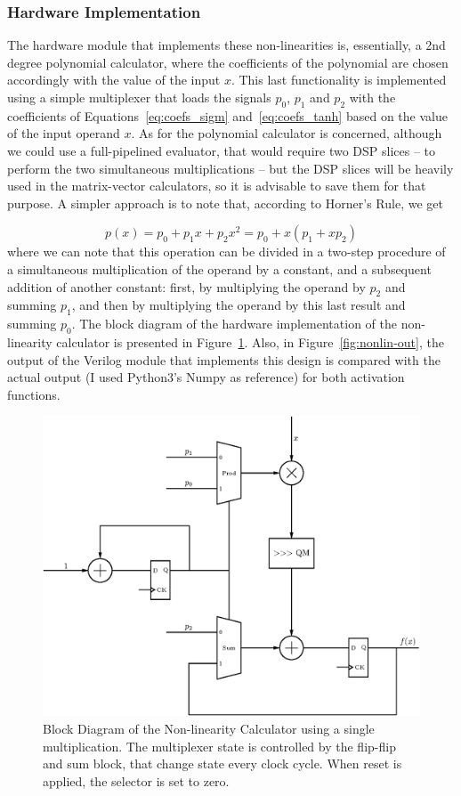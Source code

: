 \subsubsection{Hardware Implementation}
The hardware module that implements these non-linearities is, essentially, a 2nd degree polynomial calculator, where the coefficients of the polynomial are chosen accordingly with the value of the input $x$. This last functionality
is implemented using a simple multiplexer that loads the signals $p_0$, $p_1$ and $p_2$ with the coefficients of Equations~\ref{eq:coefs_sigm} and~\ref{eq:coefs_tanh} based on the value of the input operand $x$. As for the polynomial calculator is concerned, although we could use a full-pipelined evaluator, that would require two DSP slices -- to perform the two simultaneous multiplications -- but the DSP slices will be heavily used in the matrix-vector calculators, so it is advisable to save them for that purpose. A simpler approach is to note that, according to Horner's Rule, we get 

\begin{equation}\label{eq:factorPol}
p(x) = p_0 + p_1x + p_2x^2 = p_0 + x(p_1 + xp_2)
\end{equation}
where we can note that this operation can be divided in a two-step procedure of a simultaneous multiplication of the operand by a constant, and a subsequent addition of another constant: first, by multiplying the operand by $p_2$ and summing $p_1$, and then by multiplying the operand by this last result and summing $p_0$. The block diagram of the hardware implementation of the non-linearity calculator is presented in Figure~\ref{fig:nonlin}. Also, in Figure~\ref{fig:nonlin-out}, the output of the Verilog module that implements this design is compared with the actual output (I used Python3's Numpy as reference) for both activation functions.

\begin{figure}
    \centering
    \includegraphics[width=0.9\linewidth]{figures/non-lin.eps}
    \caption[Block Diagram of the Non-linearity Calculator]{Block Diagram of the Non-linearity Calculator using a single multiplication. The multiplexer state is controlled by the flip-flip and sum block, that change state every clock cycle. When reset is applied, the selector is set to zero.}
    \label{fig:nonlin}
\end{figure}

